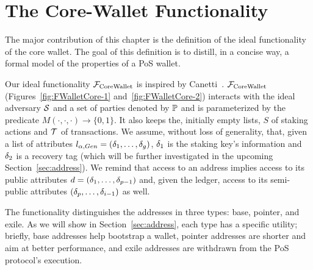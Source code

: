 \section{The Core-Wallet Functionality}\label{sec:basicdef}

The major contribution of this chapter is the definition of the ideal
functionality of the core wallet. The goal of this definition is to distill, in
a concise way, a formal model of the properties of a PoS wallet.

Our ideal functionality $\mathcal{F}_\mathrm{CoreWallet}$ is inspired by
Canetti~\cite{EPRINT:Canetti03}. $\mathcal{F}_\mathrm{CoreWallet}$ (Figures~\ref{fig:FWalletCore-1}
and~\ref{fig:FWalletCore-2}) interacts with the ideal adversary $\mathcal{S}$ and a
set of parties denoted by $\mathbb{P}$ and is parameterized by the predicate
$M(\cdot, \cdot, \cdot)\rightarrow\{0,1\}$. It also keeps the, initially empty
lists, $S$ of staking actions and $\mathcal{T}$ of transactions. We assume, without
loss of generality, that, given a list of attributes $l_{\alpha, Gen} =
(\delta_1, \ldots, \delta_g)$, $\delta_1$ is the
staking key's information and $\delta_2$ is a recovery tag (which will be
further investigated in the upcoming Section~\ref{sec:address}). We remind that
access to an address implies access to its public attributes $d =
(\delta_1, \ldots, \delta_{p-1})$ and, given the ledger, access to its
semi-public attributes $(\delta_p, \ldots, \delta_{i-1})$ as well.

The functionality distinguishes the addresses in three types: base,
pointer, and exile. As we will show in Section~\ref{sec:address}, each
type has a specific utility; briefly, base addresses help bootstrap a wallet,
pointer addresses are shorter and aim at better performance, and exile
addresses are withdrawn from the PoS protocol's execution.

